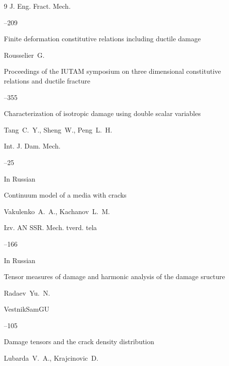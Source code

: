 \begin{thebibliography}{9}
\jour J. Eng. Fract. Mech.



--209




\paper Finite deformation constitutive relations including ductile damage

\by Rousselier~G.

\jour Proceedings of the IUTAM symposium on three dimensional constitutive relations and ductile fracture


--355




\paper Characterization of isotropic damage using double scalar variables

\by Tang~C.~Y., Sheng~W., Peng~L.~H.

\jour Int. J. Dam. Mech.



--25




\lang In Russian

\paper Continuum model of a media with cracks

\by Vakulenko~A.~A., Kachanov~L.~M.

\jour Izv. AN SSR. Mech. tverd. tela



--166




\lang In Russian

\paper Tensor measures of damage and harmonic analysis of the damage sructure

\by Radaev~Yu.~N.

\jour VestnikSamGU



--105




\paper Damage tensors and the crack density distribution

\by Lubarda~V.~A., Krajcinovic~D.


\end{thebibliography}
